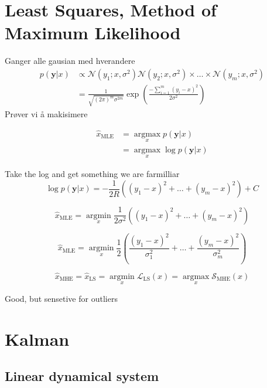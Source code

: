 \documentclass[a4paper]{article}
\begin{document}
\newpage

\section{Least Squares, Method of Maximum Likelihood}
\label{sec-4}

Ganger alle gausian med hverandere
$$\begin{aligned} p(\mathbf{y} | x) & \propto \mathcal{N}\left(y_{1} ; x, \sigma^{2}\right) \mathcal{N}\left(y_{2} ; x, \sigma^{2}\right) \times \ldots \times \mathcal{N}\left(y_{m} ; x, \sigma^{2}\right) \\ &=\frac{1}{\sqrt{(2 \pi)^{m} \sigma^{2 m}}} \exp \left(\frac{-\sum_{i=1}^{m}\left(y_{i}-x\right)^{2}}{2 \sigma^{2}}\right)
\end{aligned}$$ Prøver vi å makisimere

$$\begin{aligned} \hat{x}_{\mathrm{MLE}} &=\underset{x}{\operatorname{argmax}} p(\mathbf{y} | x) \\ &=\underset{x}{\operatorname{argmax}} \log p(\mathbf{y} | x) \end{aligned}$$

Take the log and get something we are farmilliar
$$\log p(\mathbf{y} | x)=-\frac{1}{2 R}\left(\left(y_{1}-x\right)^{2}+\ldots+\left(y_{m}-x\right)^{2}\right)+C$$

$$\hat{x}_{\mathrm{MLE}}=\underset{x}{\operatorname{argmin}} \frac{1}{2 \sigma^{2}}\left(\left(y_{1}-x\right)^{2}+\ldots+\left(y_{m}-x\right)^{2}\right)$$

$$\hat{x}_{\mathrm{MLE}}=\underset{x}{\operatorname{argmin}} \frac{1}{2}\left(\frac{\left(y_{1}-x\right)^{2}}{\sigma_{1}^{2}}+\ldots+\frac{\left(y_{m}-x\right)^{2}}{\sigma_{m}^{2}}\right)$$

$$\hat{x}_{\mathrm{MHE}}=\hat{x}_{\mathrm{LS}}=\underset{x}{\operatorname{argmin}} 
 \mathscr{L}_{\mathrm{LS}}(x)=\underset{x}{\operatorname{argmax}} \mathscr{S}_{\mathrm{MHE}}(x)$$

Good, but sensetive for outliers


\newpage

\newpage

\section{Kalman}
\label{sec-5}
\subsection{Linear dynamical system}
\label{sec-5-1}
\end{document}
